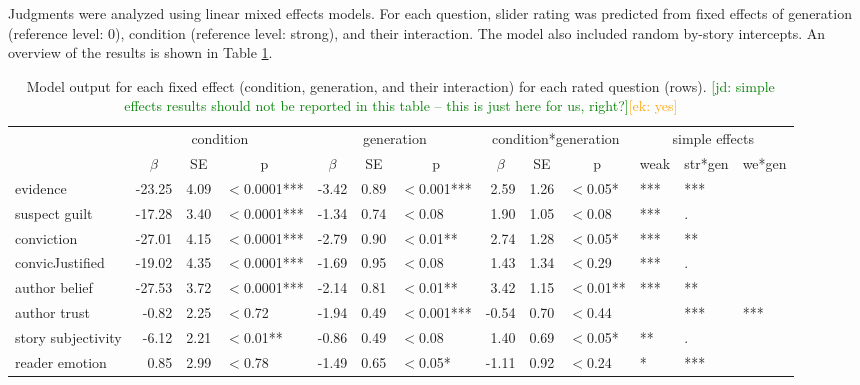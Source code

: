 \documentclass[10pt,letterpaper]{article}
\newcommand{\ek}[1]{\textcolor{Orange}{[ek: #1]}}
\newcommand{\jd}[1]{\textcolor{Green}{[jd: #1]}}
\begin{document}
Judgments were analyzed using linear mixed effects models. For each question, slider rating was predicted from fixed effects of generation (reference level: 0), condition (reference level: strong), and their interaction. The model also included random by-story intercepts. An overview of the results is shown in Table \ref{tab:exp2results}.

	\begin{table}
		\centering
		\begin{tabular}{l r r l r r l r r l l l l}
			\toprule
			& \multicolumn{3}{c}{condition} & \multicolumn{3}{c}{generation} & \multicolumn{3}{c}{condition*generation} & \multicolumn{3}{c}{simple effects}\\
			& \multicolumn{1}{c}{$\beta$} & \multicolumn{1}{c}{SE} & \multicolumn{1}{c}{p} & \multicolumn{1}{c}{$\beta$} & \multicolumn{1}{c}{SE} & \multicolumn{1}{c}{p} & \multicolumn{1}{c}{$\beta$} & \multicolumn{1}{c}{SE} & \multicolumn{1}{c}{p} & \multicolumn{1}{c}{weak} & \multicolumn{1}{c}{str*gen} & \multicolumn{1}{c}{we*gen}\\
			\midrule
			evidence                  & -23.25 & 4.09 & $<$0.0001*** & -3.42 & 0.89 & $<$0.001*** & 2.59  & 1.26 & $<$0.05*  & *** & *** & \\
			suspect guilt          & -17.28  & 3.40 & $<$0.0001*** & -1.34 & 0.74 & $<$0.08           & 1.90  & 1.05 & $<$0.08 & *** & . & \\
			conviction               & -27.01 & 4.15  & $<$0.0001*** & -2.79 & 0.90 & $<$0.01**     & 2.74  & 1.28 & $<$0.05*  & *** & ** & \\
			convicJustified       & -19.02 & 4.35 & $<$0.0001***  & -1.69 & 0.95 & $<$0.08           & 1.43 & 1.34 & $<$0.29   & *** & . &  \\
			author belief            & -27.53 & 3.72 & $<$0.0001***  & -2.14 & 0.81 & $<$0.01**      & 3.42  & 1.15 & $<$0.01** & *** & ** & \\
			author trust            & -0.82   & 2.25 & $<$0.72           & -1.94 & 0.49 & $<$0.001*** & -0.54 & 0.70 & $<$0.44   & & *** & *** \\
			story subjectivity     & -6.12   & 2.21 & $<$0.01**          & -0.86 & 0.49 & $<$0.08         & 1.40   & 0.69 & $<$0.05* & ** & . & \\
			reader emotion        & 0.85   & 2.99 & $<$0.78            & -1.49 & 0.65 & $<$0.05*     & -1.11  & 0.92 & $<$0.24  & * & *** & \\
					\bottomrule
		\end{tabular}
		\caption{Model output for each fixed effect (condition, generation, and their interaction) for each rated question (rows). \jd{simple effects results should not be reported in this table -- this is just here for us, right?}\ek{yes}}
		\label{tab:exp2results}
	\end{table}
\end{document}
